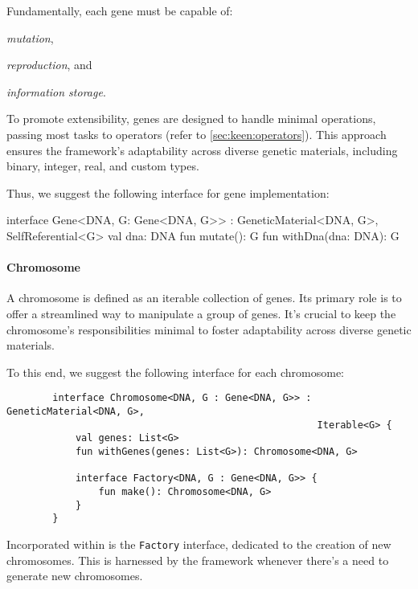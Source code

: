       Fundamentally, each gene must be capable of:
      \begin{enumerate*}
        \item \textit{mutation},
        \item \textit{reproduction}, and
        \item \textit{information storage}.
      \end{enumerate*}
      To promote extensibility, genes are designed to handle minimal 
      operations, passing most tasks to operators 
      (refer to \vref{sec:keen:operators}).
      This approach ensures the framework's adaptability across diverse 
      genetic materials, including binary, integer, real, and custom types.

      Thus, we suggest the following interface for gene implementation:

      \begin{kotlin}
        interface Gene<DNA, G: Gene<DNA, G>> : GeneticMaterial<DNA, G>, 
                                               SelfReferential<G> {
            val dna: DNA
            fun mutate(): G
            fun withDna(dna: DNA): G
        }
      \end{kotlin}

    \paragraph{Chromosome}
      A chromosome is defined as an iterable collection of genes.
      Its primary role is to offer a streamlined way to manipulate a group 
      of genes.
      It's crucial to keep the chromosome's responsibilities minimal to 
      foster adaptability across diverse genetic materials.
      
      To this end, we suggest the following interface for each chromosome:
      
      \begin{verbatim}
        interface Chromosome<DNA, G : Gene<DNA, G>> : GeneticMaterial<DNA, G>, 
                                                      Iterable<G> {
            val genes: List<G>
            fun withGenes(genes: List<G>): Chromosome<DNA, G>
      
            interface Factory<DNA, G : Gene<DNA, G>> {
                fun make(): Chromosome<DNA, G>
            }
        }
      \end{verbatim}
      
      Incorporated within is the \texttt{Factory} interface, dedicated to 
      the creation of new chromosomes.
      This is harnessed by the framework whenever there's a need to generate 
      new chromosomes.

